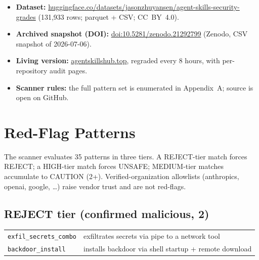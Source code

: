 \documentclass[11pt]{article}
\begin{document}
\begin{itemize}
  \item \textbf{Dataset:}
        \href{https://huggingface.co/datasets/jasonzhuyansen/agent-skills-security-grades}{huggingface.co/datasets/jasonzhuyansen/agent-skills-security-grades}
        (131,933 rows; parquet + CSV; CC~BY~4.0).
  \item \textbf{Archived snapshot (DOI):}
        \href{https://doi.org/10.5281/zenodo.21292799}{doi:10.5281/zenodo.21292799}
        (Zenodo, CSV snapshot of 2026-07-06).
  \item \textbf{Living version:} \href{https://agentskillshub.top}{agentskillshub.top},
        regraded every 8 hours, with per-repository audit pages.
  \item \textbf{Scanner rules:} the full pattern set is enumerated in
        Appendix~A; source is open on GitHub.
\end{itemize}

\appendix
\section{Red-Flag Patterns}

The scanner evaluates 35 patterns in three tiers. A REJECT-tier match forces
REJECT; a HIGH-tier match forces UNSAFE; MEDIUM-tier matches accumulate to
CAUTION (2+). Verified-organization allowlists (anthropics, openai, google,
\ldots) raise vendor trust and are not red-flags.

\subsection*{REJECT tier (confirmed malicious, 2)}
\small
\begin{tabular}{lp{9cm}}
\texttt{exfil\_secrets\_combo} & exfiltrates secrets via pipe to a network tool \\
\texttt{backdoor\_install} & installs backdoor via shell startup + remote download \\
\end{tabular}
\end{document}
